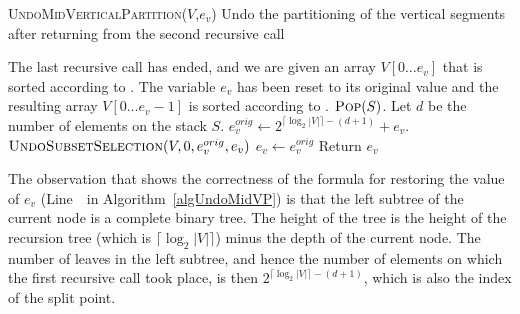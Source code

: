 \begin{algorithm}

  \caption{\textsc{UndoMidVerticalPartition}(${V}$,$e_v$)
  Undo the partitioning of the vertical segments after returning from
  the second recursive call}
  \label{algUndoMidVP}
   
  \begin{algorithmic}[1]
    \REQUIRE The last recursive call has ended, and we are
    given an array ${V}[0\ldots e_v]$ that is
    sorted  according to \LU.
    \ENSURE The variable $e_v$ has been reset to its original value and 
    the resulting array ${V}[0\ldots e_v-1]$ is sorted 
    according to \LU.  
    \STATE $\textsc{Pop}(S)$.
    \STATE Let $d$ be the number of elements on the stack $S$.
    \STATE $e_v^{orig} \leftarrow 2^{\lceil\log_2 |V|\rceil - (d+1)} +
    e_v$. \setcounter{RestoreRight}{\value{ALC@line}} 
    \STATE $\textsc{UndoSubsetSelection}({V},0,e_v^{orig},e_v)$
    \STATE $e_v \leftarrow e_v^{orig}$
    \STATE Return $e_v$
 \end{algorithmic}
\end{algorithm}

The observation that shows the correctness of the formula for
restoring the value of $e_v$ (Line~\theRestoreRight\ in 
Algorithm~\ref{algUndoMidVP}) is that the left
subtree of the current node is a complete binary tree. The height of
the tree is the height of the recursion tree (which is $\lceil\log_2
|V|\rceil$) minus the depth of the current node.
The number of leaves in the
left subtree, and hence the number of elements on which the first 
recursive call took place, is then $2^{\lceil\log_2 |V|\rceil -
  (d+1)}$, which is also the index of the split point.

